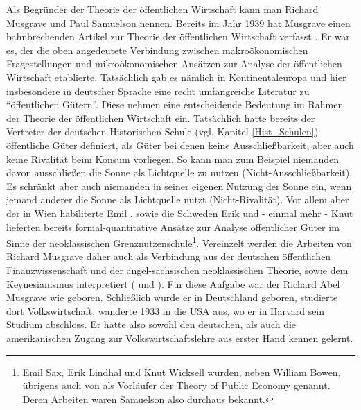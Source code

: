 Als Begründer der Theorie der öffentlichen Wirtschaft kann man Richard Musgrave und Paul Samuelson nennen. Bereits im Jahr 1939 hat Musgrave einen bahnbrechenden Artikel zur Theorie der öffentlichen Wirtschaft verfasst \parencite{Musgrave1939}. Er war es, der die oben angedeutete Verbindung zwischen makroökonomischen Fragestellungen und mikroökonomischen Ansätzen zur Analyse der öffentlichen Wirtschaft etablierte. Tatsächlich gab es nämlich in Kontinentaleuropa und hier insbesondere in deutscher Sprache eine recht umfangreiche Literatur zu "`öffentlichen Gütern"'. Diese nehmen eine entscheidende Bedeutung im Rahmen der Theorie der öffentlichen Wirtschaft ein. Tatsächlich hatte bereits der Vertreter der deutschen Historischen Schule (vgl. Kapitel \ref{Hist_Schulen}) \textcite{Wagner1892} öffentliche Güter definiert, als Güter bei denen keine Ausschließbarkeit, aber auch keine Rivalität beim Konsum vorliegen. So kann man zum Beispiel niemanden davon ausschließen die Sonne als Lichtquelle zu nutzen (Nicht-Ausschließbarkeit). Es schränkt aber auch niemanden in seiner eigenen Nutzung der Sonne ein, wenn jemand anderer die Sonne als Lichtquelle nutzt (Nicht-Rivalität). Vor allem aber der in Wien habiliterte Emil \textcite{Sax1887}, sowie die Schweden Erik \textcite{Lindhal1928} und - einmal mehr - Knut \textcite{Wicksell1896} lieferten bereits formal-quantitative Ansätze zur Analyse öffentlicher Güter im Sinne der neoklassischen Grenznutzenschule\footnote{Emil Sax, Erik Lindhal und Knut Wicksell wurden, neben William Bowen, übrigens auch von \textcite{Samuelson1954} als Vorläufer der Theory of Public Economy genannt. Deren Arbeiten waren Samuelson also durchaus bekannt.}. Vereinzelt werden die Arbeiten von Richard Musgrave daher auch als Verbindung aus der deutschen öffentlichen Finanzwissenschaft und der angel-sächsischen neoklassischen Theorie, sowie dem Keynesianismus interpretiert (\textcite[S. 13]{Sinn2007} und \textcite[S. 589]{Sturn2007}). Für diese Aufgabe war der Richard Abel Musgrave wie geboren. Schließlich wurde er in Deutschland geboren, studierte dort Volkswirtschaft, wanderte 1933 in die USA aus, wo er in Harvard sein Studium abschloss. Er hatte also sowohl den deutschen, als auch die amerikanischen Zugang zur Volkswirtschaftslehre aus erster Hand kennen gelernt.

